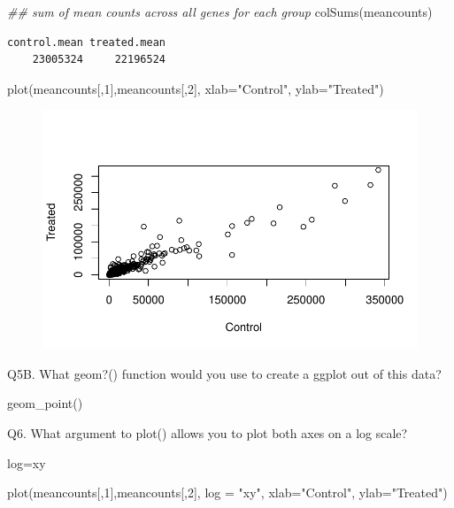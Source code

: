 \documentclass[
  letterpaper,
  DIV=11,
  numbers=noendperiod]{scrartcl}
\newenvironment{Shaded}{\begin{snugshade}}{\end{snugshade}}
\newcommand{\AttributeTok}[1]{\textcolor[rgb]{0.40,0.45,0.13}{#1}}
\newcommand{\DecValTok}[1]{\textcolor[rgb]{0.68,0.00,0.00}{#1}}
\newcommand{\DocumentationTok}[1]{\textcolor[rgb]{0.37,0.37,0.37}{\textit{#1}}}
\newcommand{\FunctionTok}[1]{\textcolor[rgb]{0.28,0.35,0.67}{#1}}
\newcommand{\NormalTok}[1]{\textcolor[rgb]{0.00,0.23,0.31}{#1}}
\newcommand{\StringTok}[1]{\textcolor[rgb]{0.13,0.47,0.30}{#1}}
\begin{document}
\begin{Shaded}
\begin{Highlighting}[]
\DocumentationTok{\#\# sum of mean counts across all genes for each group}
\FunctionTok{colSums}\NormalTok{(meancounts)}
\end{Highlighting}
\end{Shaded}

\begin{verbatim}
control.mean treated.mean 
    23005324     22196524 
\end{verbatim}

\begin{Shaded}
\begin{Highlighting}[]
\FunctionTok{plot}\NormalTok{(meancounts[,}\DecValTok{1}\NormalTok{],meancounts[,}\DecValTok{2}\NormalTok{], }\AttributeTok{xlab=}\StringTok{"Control"}\NormalTok{, }\AttributeTok{ylab=}\StringTok{"Treated"}\NormalTok{)}
\end{Highlighting}
\end{Shaded}

\begin{figure}[H]

{\centering \includegraphics{12writeup_files/figure-pdf/unnamed-chunk-9-1.pdf}

}

\end{figure}

Q5B. What geom?() function would you use to create a ggplot out of this
data?

geom\_point()

Q6. What argument to plot() allows you to plot both axes on a log scale?

log=xy

\begin{Shaded}
\begin{Highlighting}[]
\FunctionTok{plot}\NormalTok{(meancounts[,}\DecValTok{1}\NormalTok{],meancounts[,}\DecValTok{2}\NormalTok{], }\AttributeTok{log =} \StringTok{"xy"}\NormalTok{,  }\AttributeTok{xlab=}\StringTok{"Control"}\NormalTok{, }\AttributeTok{ylab=}\StringTok{"Treated"}\NormalTok{)}
\end{Highlighting}
\end{Shaded}
\end{document}
